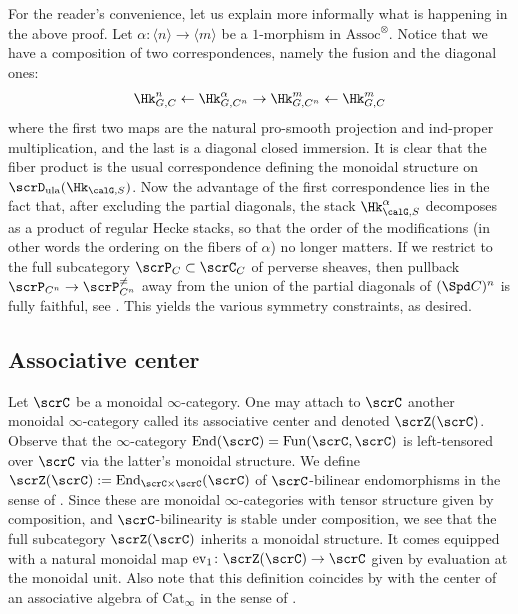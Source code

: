 \documentclass[10pt, reqno]{amsart}
\theoremstyle{plain}
\theoremstyle{definition}
\numberwithin{equation}{section}
\begin{document}
	For the reader's convenience, let us explain more informally what is happening in the above proof. Let $\alpha \colon \langle n \rangle \to \langle m \rangle$ be a $1$-morphism in $\mathrm{Assoc}^\otimes$. Notice that we have a composition of two correspondences, namely the fusion and the diagonal ones:
	\begin{equation}
		\Hk_{G, C}^n \leftarrow \Hk^\alpha_{G,C^n} \rightarrow \Hk_{G,C^n}^m \leftarrow \Hk_{G,C}^m
	\end{equation}
	where the first two maps are the natural pro-smooth projection and ind-proper multiplication, and the last is a diagonal closed immersion. It is clear that the fiber product is the usual correspondence defining the monoidal structure on $\scrD_{\mathrm{ula}}(\Hk_{\calG,S})$. Now the advantage of the first correspondence lies in the fact that, after excluding the partial diagonals, the stack $\Hk_{\calG, S}^\alpha$ decomposes as a product of regular Hecke stacks, so that the order of the modifications (in other words the ordering on the fibers of $\alpha$) no longer matters. If we restrict to the full subcategory $\scrP_C \subset \scrC_C$ of perverse sheaves, then pullback $\scrP_{C^n} \to \scrP_{C^n}^{\neq}$ away from the union of the partial diagonals of $(\Spd C)^n$ is fully faithful, see \cite[Proposition VI.9.3]{FS21}. This yields the various symmetry constraints, as desired. 
	
	
	
	\subsection{Associative center}
	
	Let $\scrC$ be a monoidal $\infty$-category. One may attach to $\scrC$ another monoidal $\infty$-category called its associative center and denoted $\scrZ(\scrC)$. Observe that the $\infty$-category $\mathrm{End}(\mathrm{\scrC})=\mathrm{Fun}(\scrC,\scrC)$ is left-tensored over $\scrC$ via the latter's monoidal structure. We define $\scrZ(\scrC):=\mathrm{End}_{\scrC\times \scrC}(\scrC)$ of $\scrC$-bilinear endomorphisms in the sense of \cite[Definition 4.6.2.7]{Lur17}. Since these are monoidal $\infty$-categories with tensor structure given by composition, and $\scrC$-bilinearity is stable under composition, we see that the full subcategory $\scrZ(\scrC)$ inherits a monoidal structure. It comes equipped with a natural monoidal map $\mathrm{ev}_1\colon \scrZ(\scrC) \to \scrC $ given by evaluation at the monoidal unit. Also note that this definition coincides by \cite[Theorem 4.4.1.28, Theorem 5.3.1.30]{Lur17} with the center of an associative algebra of $\mathrm{Cat}_\infty$ in the sense of \cite[Definition 5.3.1.12]{Lur17}. 
	
\end{document}
